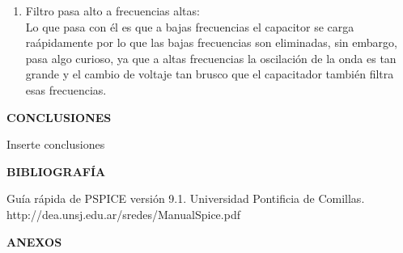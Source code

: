 \documentclass[12pt]{article}
\begin{document}
\begin{enumerate}
\begin{itemize}
			
		\end{itemize}
	
		\item Filtro pasa alto a frecuencias altas:\\
		
		\noindent Lo que pasa con él es que a bajas frecuencias el capacitor se carga raápidamente por lo que las bajas frecuencias son eliminadas, sin embargo, pasa algo curioso, ya que a altas frecuencias la oscilación de la onda es tan grande y el cambio de voltaje tan brusco que el capacitador también filtra esas frecuencias.\\
		
	\end{enumerate}
	
	\newpage
	
	\begin{center}
		\textbf{\large CONCLUSIONES}\\
	\end{center}
	
	Inserte conclusiones
	
	\newpage
	
	\begin{center}
		\textbf{\large BIBLIOGRAFÍA}\\
	\end{center}
	
	Guía rápida de PSPICE versión 9.1. Universidad Pontificia de Comillas.\\
	http://dea.unsj.edu.ar/sredes/ManualSpice.pdf
	
	\newpage
	
	\begin{center}
		\textbf{\large ANEXOS}\\
	\end{center}
	
\end{document}
